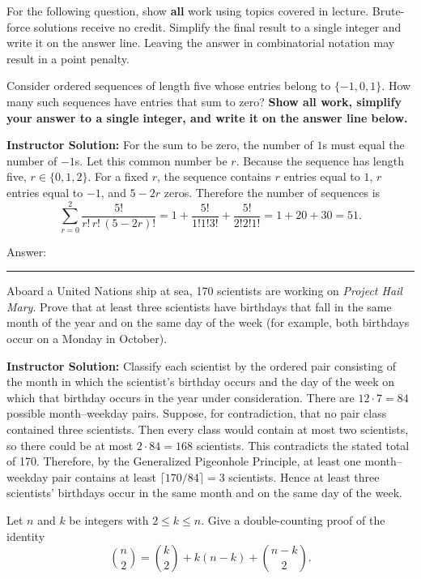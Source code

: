 \documentclass[11pt,addpoints]{exam}
\renewenvironment{solution}
{\par\medskip\noindent\hrulefill\par\smallskip\noindent\textbf{Instructor Solution:}\enspace\ignorespaces}
{\par\smallskip\noindent\hrulefill\par\medskip}
\begin{document}
\begin{questions}
\newpage
For the following question, show \textbf{all} work using topics covered in lecture. Brute-force solutions receive no credit. Simplify the final result to a single integer and write it on the answer line. Leaving the answer in combinatorial notation may result in a point penalty.

\question[12] Consider ordered sequences of length five whose entries belong to $\{-1,0,1\}$. How many such sequences have entries that sum to zero? \textbf{Show all work, simplify your answer to a single integer, and write it on the answer line below.}

\begin{solution}
For the sum to be zero, the number of $1$s must equal the number of $-1$s. Let this common number be $r$. Because the sequence has length five, $r\in\{0,1,2\}$. For a fixed $r$, the sequence contains $r$ entries equal to $1$, $r$ entries equal to $-1$, and $5-2r$ zeros. Therefore the number of sequences is
\[
\sum_{r=0}^{2}\frac{5!}{r!\,r!\,(5-2r)!}
=1+\frac{5!}{1!1!3!}+\frac{5!}{2!2!1!}
=1+20+30=\boxed{51}.
\]
\end{solution}

Answer: \rule{4cm}{0.15mm} \hspace{1cm}

\newpage
\question[16] Aboard a United Nations ship at sea, 170 scientists are working on \textit{Project Hail Mary}. Prove that at least three scientists have birthdays that fall in the same month of the year and on the same day of the week (for example, both birthdays occur on a Monday in October).

\begin{solution}
Classify each scientist by the ordered pair consisting of the month in which the scientist's birthday occurs and the day of the week on which that birthday occurs in the year under consideration. There are $12\cdot7=84$ possible month--weekday pairs. Suppose, for contradiction, that no pair class contained three scientists. Then every class would contain at most two scientists, so there could be at most $2\cdot84=168$ scientists. This contradicts the stated total of 170. Therefore, by the Generalized Pigeonhole Principle, at least one month--weekday pair contains at least $\lceil170/84\rceil=3$ scientists. Hence at least three scientists' birthdays occur in the same month and on the same day of the week.
\end{solution}

\newpage
\question[15] Let $n$ and $k$ be integers with $2\le k\le n$. Give a double-counting proof of the identity
\[
\binom{n}{2}=\binom{k}{2}+k(n-k)+\binom{n-k}{2}.
\]


\end{questions}
\end{document}
